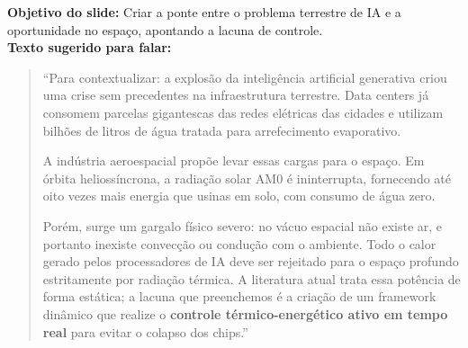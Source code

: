 \documentclass[11pt,a4paper]{article}
\begin{document}
\vspace{6pt}

\begin{tcolorbox}[colback=speechbg, colframe=bordergreen, title=\color{ifesdark}\textbf{SLIDE 2: CONTEXTO, OPORTUNIDADE ORBITAL E A LACUNA \hfill TEMPO: 0:30 -- 1:45 (Duração: 75 segundos)}]
\small
\textbf{Objetivo do slide:} Criar a ponte entre o problema terrestre de IA e a oportunidade no espaço, apontando a lacuna de controle.\\
\textbf{Texto sugerido para falar:}
\begin{quote}
``Para contextualizar: a explosão da inteligência artificial generativa criou uma crise sem precedentes na infraestrutura terrestre. Data centers já consomem parcelas gigantescas das redes elétricas das cidades e utilizam bilhões de litros de água tratada para arrefecimento evaporativo. 

A indústria aeroespacial propõe levar essas cargas para o espaço. Em órbita heliossíncrona, a radiação solar AM0 é ininterrupta, fornecendo até oito vezes mais energia que usinas em solo, com consumo de água zero. 

Porém, surge um gargalo físico severo: no vácuo espacial não existe ar, e portanto inexiste convecção ou condução com o ambiente. Todo o calor gerado pelos processadores de IA deve ser rejeitado para o espaço profundo estritamente por radiação térmica. A literatura atual trata essa potência de forma estática; a lacuna que preenchemos é a criação de um framework dinâmico que realize o \textbf{controle térmico-energético ativo em tempo real} para evitar o colapso dos chips.''
\end{quote}
\end{tcolorbox}

\vspace{6pt}
\end{document}
